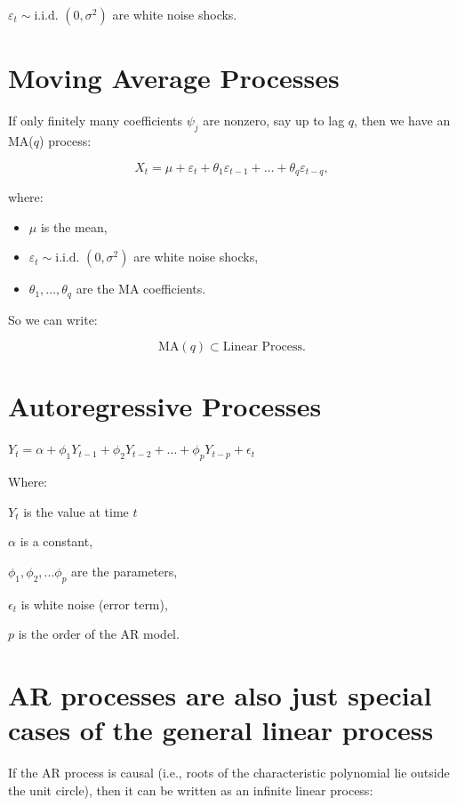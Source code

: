 \documentclass[
  11pt,
  a4paper,
]{report}
\begin{document}
\(\varepsilon_t \sim \text{i.i.d. } (0, \sigma^2)\) are white noise
shocks.

\section{Moving Average Processes}\label{moving-average-processes}

If only finitely many coefficients \(\psi_j\) are nonzero, say up to lag
\(q\), then we have an MA(\(q\)) process:

\[X_t = \mu + \varepsilon_t + \theta_1 \varepsilon_{t-1} + \dots + \theta_q \varepsilon_{t-q},\]

where:

\begin{itemize}
\item
  \(\mu\) is the mean,
\item
  \(\varepsilon_t \sim \text{i.i.d. }(0, \sigma^2)\) are white noise
  shocks,
\item
  \(\theta_1, \dots, \theta_q\) are the MA coefficients.
\end{itemize}

So we can write:

\[\text{MA}(q) \subset \text{Linear Process}.\]

\section{Autoregressive Processes}\label{autoregressive-processes}

\(Y_t = \alpha + \phi_1 Y_{t-1} + \phi_2 Y_{t-2} + \dots + \phi_p Y_{t-p} + \epsilon_t\)

Where:

\(Y_t\) is the value at time \(t\)

\(\alpha\) is a constant,

\(\phi_1, \phi_2,...\phi_p\) are the parameters,

\(\epsilon_t\) is white noise (error term),

\(p\) is the order of the AR model.

\section{AR processes are also just special cases of the general linear
process}\label{ar-processes-are-also-just-special-cases-of-the-general-linear-process}

If the AR process is causal (i.e., roots of the characteristic
polynomial lie outside the unit circle), then it can be written as an
infinite linear process:
\end{document}
